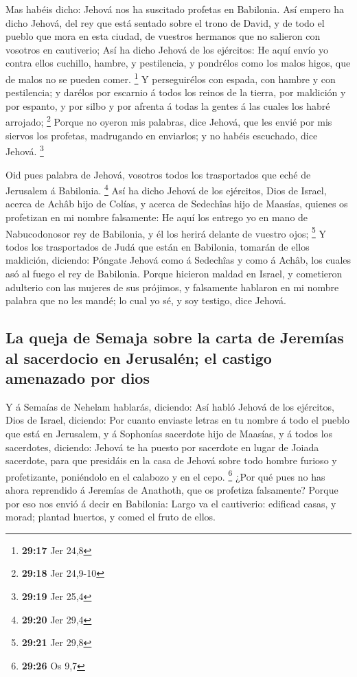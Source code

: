  Mas habéis dicho: Jehová nos ha suscitado profetas en
Babilonia.  Así empero ha dicho Jehová, del rey que está
sentado sobre el trono de David, y de todo el pueblo que mora en esta
ciudad, de vuestros hermanos que no salieron con vosotros en cautiverio;
 Así ha dicho Jehová de los ejércitos: He aquí envío yo
contra ellos cuchillo, hambre, y pestilencia, y pondrélos como los malos
higos, que de malos no se pueden comer. \footnote{\textbf{29:17} Jer
  24,8}  Y perseguirélos con espada, con hambre y con
pestilencia; y darélos por escarnio á todos los reinos de la tierra, por
maldición y por espanto, y por silbo y por afrenta á todas la gentes á
las cuales los habré arrojado; \footnote{\textbf{29:18} Jer 24,9-10}
 Porque no oyeron mis palabras, dice Jehová, que les envié
por mis siervos los profetas, madrugando en enviarlos; y no habéis
escuchado, dice Jehová. \footnote{\textbf{29:19} Jer 25,4}

 Oid pues palabra de Jehová, vosotros todos los
trasportados que eché de Jerusalem á Babilonia. \footnote{\textbf{29:20}
  Jer 29,4}  Así ha dicho Jehová de los ejércitos, Dios de
Israel, acerca de Achâb hijo de Colías, y acerca de Sedechîas hijo de
Maasías, quienes os profetizan en mi nombre falsamente: He aquí los
entrego yo en mano de Nabucodonosor rey de Babilonia, y él los herirá
delante de vuestro ojos; \footnote{\textbf{29:21} Jer 29,8}
 Y todos los trasportados de Judá que están en Babilonia,
tomarán de ellos maldición, diciendo: Póngate Jehová como á Sedechîas y
como á Achâb, los cuales asó al fuego el rey de Babilonia. 
Porque hicieron maldad en Israel, y cometieron adulterio con las mujeres
de sus prójimos, y falsamente hablaron en mi nombre palabra que no les
mandé; lo cual yo sé, y soy testigo, dice Jehová.

\hypertarget{la-queja-de-semaja-sobre-la-carta-de-jeremuxedas-al-sacerdocio-en-jerusaluxe9n-el-castigo-amenazado-por-dios}{%
\subsection{La queja de Semaja sobre la carta de Jeremías al sacerdocio
en Jerusalén; el castigo amenazado por
dios}\label{la-queja-de-semaja-sobre-la-carta-de-jeremuxedas-al-sacerdocio-en-jerusaluxe9n-el-castigo-amenazado-por-dios}}

 Y á Semaías de Nehelam hablarás, diciendo: 
Así habló Jehová de los ejércitos, Dios de Israel, diciendo: Por cuanto
enviaste letras en tu nombre á todo el pueblo que está en Jerusalem, y á
Sophonías sacerdote hijo de Maasías, y á todos los sacerdotes, diciendo:
 Jehová te ha puesto por sacerdote en lugar de Joiada
sacerdote, para que presidáis en la casa de Jehová sobre todo hombre
furioso y profetizante, poniéndolo en el calabozo y en el cepo.
\footnote{\textbf{29:26} Os 9,7}  ¿Por qué pues no has
ahora reprendido á Jeremías de Anathoth, que os profetiza falsamente?
 Porque por eso nos envió á decir en Babilonia: Largo va el
cautiverio: edificad casas, y morad; plantad huertos, y comed el fruto
de ellos.

